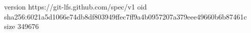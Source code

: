 version https://git-lfs.github.com/spec/v1
oid sha256:6021a5d1066e74db8df803949ffec7ff9a4b0957207a379eee49660b6b87461c
size 349676
